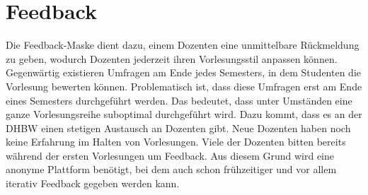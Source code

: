 \section{Feedback}\label{sec:Feedback}
Die Feedback-Maske dient dazu, einem Dozenten eine unmittelbare Rückmeldung zu geben, wodurch Dozenten jederzeit ihren Vorlesungsstil anpassen können.
Gegenwärtig existieren Umfragen am Ende jedes Semesters, in dem Studenten die Vorlesung bewerten können.
Problematisch ist, dass diese Umfragen erst am Ende eines Semesters durchgeführt werden.
Das bedeutet, dass unter Umständen eine ganze Vorlesungsreihe suboptimal durchgeführt wird.
Dazu kommt, dass es an der DHBW einen stetigen Austausch an Dozenten gibt.
Neue Dozenten haben noch keine Erfahrung im Halten von Vorlesungen.
Viele der Dozenten bitten bereits während der ersten Vorlesungen um Feedback.
Aus diesem Grund wird eine anonyme Plattform benötigt, bei dem auch schon frühzeitiger und vor allem iterativ Feedback gegeben werden kann.

